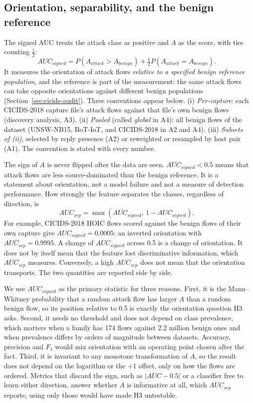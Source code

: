 \documentclass[preprint,12pt]{elsarticle}
\begin{document}
\subsection{Orientation, separability, and the benign reference}\label{sec:auc}

The signed AUC treats the attack class as positive and $A$ as the score, with ties counting $\tfrac12$:
\begin{equation}
AUC_{signed} = P(A_{attack} > A_{benign}) + \tfrac12 P(A_{attack} = A_{benign}).
\end{equation}
It measures the orientation of attack flows \emph{relative to a specified benign reference population}, and the reference is part of the measurement: the same attack flows can take opposite orientations against different benign populations (Section~\ref{sec:cicids-audit}). Three conventions appear below. (i) \emph{Per-capture}: each CICIDS-2018 capture file's attack flows against that file's own benign flows (discovery analysis, A3). (ii) \emph{Pooled} (called \emph{global} in A4): all benign flows of the dataset (UNSW-NB15, BoT-IoT, and CICIDS-2018 in A2 and A4). (iii) \emph{Subsets of (ii)}, selected by reply presence (A2) or reweighted or resampled by host pair (A1). The convention is stated with every number.

The sign of $A$ is never flipped after the data are seen. $AUC_{signed}<0.5$ means that attack flows are less source-dominated than the benign reference. It is a statement about orientation, not a model failure and not a measure of detection performance. How strongly the feature separates the classes, regardless of direction, is
\begin{equation}
AUC_{sep} = \max(AUC_{signed},\, 1 - AUC_{signed}).
\end{equation}
For example, CICIDS-2018 HOIC flows scored against the benign flows of their own capture give $AUC_{signed}=0.0005$: an inverted orientation with $AUC_{sep}=0.9995$. A change of $AUC_{signed}$ across 0.5 is a change of orientation. It does not by itself mean that the feature lost discriminative information, which $AUC_{sep}$ measures. Conversely, a high $AUC_{sep}$ does not mean that the orientation transports. The two quantities are reported side by side.

We use $AUC_{signed}$ as the primary statistic for three reasons. First, it is the Mann--Whitney probability that a random attack flow has larger $A$ than a random benign flow, so its position relative to 0.5 is exactly the orientation question H3 asks. Second, it needs no threshold and does not depend on class prevalence, which matters when a family has 174 flows against 2.2 million benign ones and when prevalence differs by orders of magnitude between datasets. Accuracy, precision and $F_1$ would mix orientation with an operating point chosen after the fact. Third, it is invariant to any monotone transformation of $A$, so the result does not depend on the logarithm or the $+1$ offset, only on how the flows are ordered. Metrics that discard the sign, such as $|AUC-0.5|$ or a classifier free to learn either direction, answer whether $A$ is informative at all, which $AUC_{sep}$ reports; using only those would have made H3 untestable.
\end{document}
